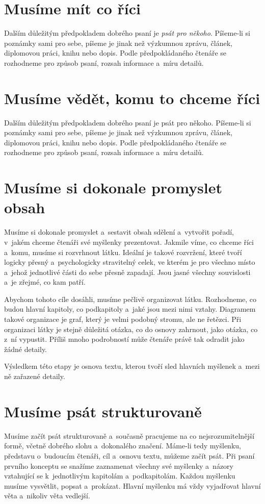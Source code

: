 \section{Musíme mít co říci}
Dalším důležitým předpokladem dobrého psaní je {\it psát pro někoho}. Píšeme-li si poznámky sami pro sebe, píšeme je jinak než výzkumnou zprávu, článek, diplomovou práci, knihu nebo dopis. Podle předpokládaného čtenáře se rozhodneme pro způsob psaní, rozsah informace a~míru detailů.

\section{Musíme vědět, komu to chceme říci}
Dalším důležitým předpokladem dobrého psaní je psát pro někoho. Píšeme-li si poznámky sami pro sebe, píšeme je jinak než výzkumnou zprávu, článek, diplomovou práci, knihu nebo dopis. Podle předpokládaného čtenáře se rozhodneme pro způsob psaní, rozsah informace a~míru detailů.

\section{Musíme si dokonale promyslet obsah}
Musíme si dokonale promyslet a~sestavit obsah sdělení a~vytvořit pořadí, v~jakém chceme čtenáři své myšlenky prezentovat. 
Jakmile víme, co chceme říci a~komu, musíme si rozvrhnout látku. Ideální je takové rozvržení, které tvoří logicky přesný a~psychologicky stravitelný celek, ve kterém je pro všechno místo a~jehož jednotlivé části do sebe přesně zapadají. Jsou jasné všechny souvislosti a~je zřejmé, co kam patří.

Abychom tohoto cíle dosáhli, musíme pečlivě organizovat látku. Rozhodneme, co budou hlavní kapitoly, co podkapitoly a~jaké jsou mezi nimi vztahy. Diagramem takové organizace je graf, který je velmi podobný stromu, ale ne řetězci. Při organizaci látky je stejně důležitá otázka, co do osnovy zahrnout, jako otázka, co z~ní vypustit. Příliš mnoho podrobností může čtenáře právě tak odradit jako žádné detaily.

Výsledkem této etapy je osnova textu, kterou tvoří sled hlavních myšlenek a~mezi ně zařazené detaily.

\section{Musíme psát strukturovaně} 
Musíme začít psát strukturovaně a~současně pracujeme na co nejsrozumitelnější formě, včetně dobrého slohu a~dokonalého značení. 
Máme-li tedy myšlenku, představu o~budoucím čtenáři, cíl a~osnovu textu, můžeme začít psát. Při psaní prvního konceptu se snažíme zaznamenat všechny své myšlenky a~názory vztahující se k~jednotlivým kapitolám a~podkapitolám. Každou myšlenku musíme vysvětlit, popsat a~prokázat. Hlavní myšlenku má vždy vyjadřovat hlavní věta a~nikoliv věta vedlejší.

